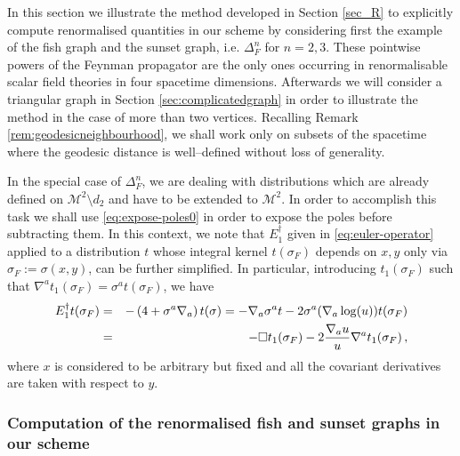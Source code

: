 \documentclass[a4paper,10pt,twoside]{article}
\numberwithin{equation}{section}
\newcounter{and}
\def\M{\mathcal{M}}
\theoremstyle{plain}
\theoremstyle{definition}
\begin{document}
In this section we illustrate the method developed in Section \ref{sec_R} to explicitly compute renormalised quantities in our scheme by considering first the example of the fish graph and the sunset graph, i.e. $\Delta^n_F$ for $n=2,3$. These pointwise powers of the Feynman propagator are the only ones occurring in renormalisable scalar field theories in four spacetime dimensions. Afterwards we will consider a triangular graph in Section \ref{sec:complicatedgraph} in order to illustrate the method in the case of more than two vertices. Recalling Remark \ref{rem:geodesicneighbourhood}, we shall work only on subsets of the spacetime where the geodesic distance is well--defined without loss of generality.

In the special case of $\Delta^n_F$, we are dealing with distributions which are already defined on $\M^2\setminus d_2$ and have to be extended to $\M^2$. In order to accomplish this task we shall use \eqref{eq:expose-poles0} in order to expose the poles before subtracting them. In this context, we note that  $E^\dagger_1$ given in \eqref{eq:euler-operator} applied to a distribution $t$ whose integral kernel $t(\sigma_F)$ depends on $x,y$  only via $\sigma_F:=\sigma(x,y)$, can be further simplified. 
In particular, introducing $t_1(\sigma_F)$ such that $\nabla^a t_1(\sigma_F) = \sigma^a t(\sigma_F)$, we have 
\begin{eqnarray}\label{eq:E-simplified}
E^\dagger_1 t(\sigma_F)&=& -\left( 4 +  \sigma^a\nabla_a   \right)t(\sigma)  = 
- \nabla_a \sigma^a  t - 2 \sigma^a (\nabla_a \log (u))   t(\sigma_F)  \\ &=&
- \Box t_1(\sigma_F)  - 2  \frac{\nabla_a u}{u}   \nabla^a t_1(\sigma_F)\,,\notag  
\end{eqnarray}
where $x$ is considered to be arbitrary but fixed and all the covariant derivatives are taken with respect to $y$.

\subsubsection{Computation of the renormalised fish and sunset graphs in our scheme}
\end{document}
